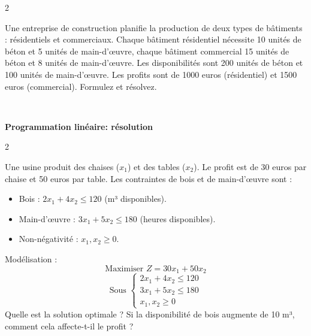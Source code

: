\begin{multicols}{2}
\begin{exo}
	Une entreprise de construction planifie la production de deux types de bâtiments : résidentiels et commerciaux. Chaque bâtiment résidentiel nécessite 10 unités de béton et 5 unités de main-d'œuvre, chaque bâtiment commercial 15 unités de béton et 8 unités de main-d'œuvre. Les disponibilités sont 200 unités de béton et 100 unités de main-d'œuvre. Les profits sont de 1000 euros (résidentiel) et 1500 euros (commercial). Formulez et résolvez.
\end{exo}

\end{multicols}
\quad\\
\begin{center}
\textbf{{\large Programmation linéaire: résolution}}
\end{center}
\begin{multicols}{2}

\begin{exo}
	Une usine produit des chaises (\(x_1\)) et des tables (\(x_2\)). Le profit est de 30 euros par chaise et 50 euros par table. Les contraintes de bois et de main-d'œuvre sont :
	\begin{itemize}
		\item Bois : \(2x_1 + 4x_2 \leq 120\) (m³ disponibles).
		\item Main-d'œuvre : \(3x_1 + 5x_2 \leq 180\) (heures disponibles).
		\item Non-négativité : \(x_1, x_2 \geq 0\).
	\end{itemize}
	Modélisation :
	\[
	\text{Maximiser } Z = 30x_1 + 50x_2
	\]
	\[
	\text{Sous } \begin{cases}
	2x_1 + 4x_2 \leq 120 \\
	3x_1 + 5x_2 \leq 180 \\
	x_1, x_2 \geq 0
	\end{cases}
	\]
	Quelle est la solution optimale ? Si la disponibilité de bois augmente de 10 m³, comment cela affecte-t-il le profit ?
\end{exo}


\end{multicols}
